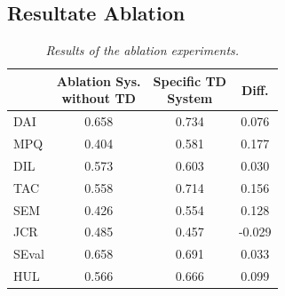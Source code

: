 \subsection{Resultate Ablation}
\begin{table}[!t]
	\centering
	\small
	\begin{tabular}{l|ccc}
		&\specialcell{Ablation Sys. \\ without TD}&\specialcell{Specific TD\\System}    &Diff.  \\
		\hline
		DAI 	&0.658&	0.734&	0.076  \\
		MPQ	&0.404&	0.581&	0.177  \\
		DIL	&0.573&	0.603&	0.030  \\
		TAC	&0.558&	0.714&	0.156  \\
		SEM	&0.426&	0.554&	0.128  \\
		JCR	&0.485&	0.457&	-0.029 \\
		SEval	&0.658&	0.691&	0.033  \\
		HUL	&0.566&	0.666&	0.099
		
	\end{tabular}
	\caption{\textit{Results of the ablation experiments.}}
	\label{tbl:ablation}
\end{table}
